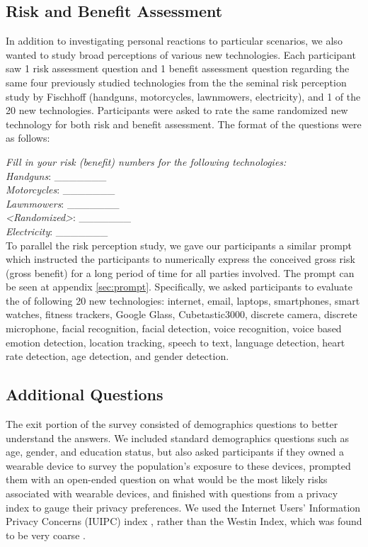 \documentclass{acm_proc_article-sp}
\begin{document}
\subsection{Risk and Benefit Assessment}
In addition to investigating personal reactions to particular scenarios, we also wanted to study broad perceptions of various new technologies. Each participant saw 1 risk assessment question and 1 benefit assessment question regarding the same four previously studied technologies from the the seminal risk perception study by Fischhoff (handguns, motorcycles, lawnmowers, electricity), and 1 of the 20 new technologies.  Participants were asked to rate the same randomized new technology for both risk and benefit assessment. The format of the questions were as follows:

\textit{Fill in your risk (benefit) numbers for the following technologies:}\\[-.5cm]

\textit{Handguns}: \_\_\_\_\_\_\_ \\
\textit{Motorcycles}: \_\_\_\_\_\_\_\\
\textit{Lawnmowers}: \_\_\_\_\_\_\_\\
\textit{<Randomized>}: \_\_\_\_\_\_\_\\
\textit{Electricity}: \_\_\_\_\_\_\_\\ [-.5cm]

To parallel the risk perception study, we gave our participants a similar prompt which instructed the participants to numerically express the conceived gross risk (gross benefit) for a long period of time for all parties involved. The prompt can be seen at appendix \ref{sec:prompt}. Specifically, we asked participants to evaluate the of following 20 new technologies: internet, email, laptops, smartphones, smart watches, fitness trackers, Google Glass, Cubetastic3000, discrete camera, discrete microphone, facial recognition, facial detection, voice recognition, voice based emotion detection, location tracking, speech to text, language detection, heart rate detection, age detection, and gender detection. 

\subsection{Additional Questions}
The exit portion of the survey consisted of demographics questions to better understand the answers. We included standard demographics questions such as age, gender, and education status, but also asked participants if they owned a wearable device to survey the population's exposure to these devices, prompted them with an open-ended question on what would be the most likely risks associated with wearable devices, and finished with questions from a privacy index to gauge their privacy preferences. We used the Internet Users' Information Privacy Concerns (IUIPC) index \cite{malhotra2004internet}, rather than the Westin Index, which was found to be very coarse \cite{woodruff2014would}.
\end{document}
